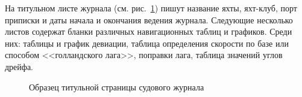 \documentclass[a4paper, 12pt, twoside, final, book, russian, fittopage, cyremdash]{ncc}
\newcommand{\ris}[1]{\ref{fig:#1}}
\begin{document}
На титульном листе журнала (см. рис.~\ris{j-title}) пишут название яхты, яхт-клуб, порт приписки и даты начала и окончания ведения журнала. Следующие несколько листов содержат бланки различных навигационных таблиц и графиков. Среди них: таблицы и график девиации, таблица определения скорости по базе или способом <<голландского лага>>, поправки лага, таблица значений углов дрейфа.

\begin{figure}[htb]
  \centering{}
  \caption{Образец титульной страницы судового журнала}
  \label{fig:j-title}
\end{figure} 
\end{document}
